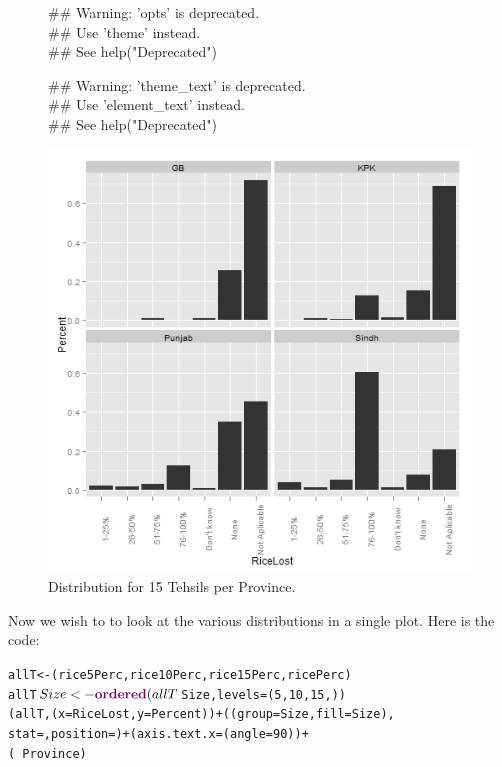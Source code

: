 \begin{figure}[!hbtp]
\begin{knitrout}
\color{fgcolor}\begin{kframe}


{\ttfamily\noindent\textcolor{warningcolor}{\#\# Warning: 'opts' is deprecated.\\\#\# Use 'theme' instead.\\\#\# See help("Deprecated")}}

{\ttfamily\noindent\textcolor{warningcolor}{\#\# Warning: 'theme\_text' is deprecated.\\\#\# Use 'element\_text' instead.\\\#\# See help("Deprecated")}}\end{kframe}\includegraphics[width=.9\linewidth]{smallerDist/figures/fifteenDist} 
\end{knitrout}

\caption{Distribution for 15 Tehsils per Province.\label{fig:fifteenDist}}
\end{figure}

Now we wish to to look at the various distributions in a single plot.  Here is the code:
\begin{knitrout}
\color{fgcolor}\begin{kframe}
\begin{alltt}
allT <- (rice5Perc, rice10Perc, rice15Perc, ricePerc)
allT$Size <- \hlfunctioncall{ordered}(allT$Size, levels = (5, 10, 15, ))
(allT, (x = RiceLost, y = Percent)) + ((group = Size, fill = Size), 
    stat = , position = ) + (axis.text.x = (angle = 90)) + 
    (~Province)
\end{alltt}
\end{kframe}
\end{knitrout}


